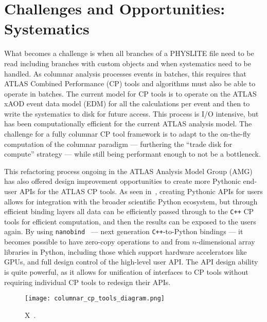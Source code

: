 \section{Challenges and Opportunities: Systematics}\label{sec:challenges}

What becomes a challenge is when all branches of a PHYSLITE file need to be read including branches with custom objects and when systematics need to be handled.
As columnar analysis processes events in batches, this requires that ATLAS Combined Performance (CP) tools and algorithms must also be able to operate in batches.
The current model for CP tools is to operate on the ATLAS xAOD event data model (EDM) for all the calculations per event and then to write the systematics to disk for future access.
This process is I/O intensive, but has been computationally efficient for the current ATLAS analysis model.
The challenge for a fully columnar CP tool framework is to adapt to the on-the-fly computation of the columnar paradigm --- furthering the ``trade disk for compute'' strategy --- while still being performant enough to not be a bottleneck.

This refactoring process ongoing in the ATLAS Analysis Model Group (AMG) has also offered design improvement opportunities to create more Pythonic end-user APIs for the ATLAS CP tools.
As seen in~, creating Pythonic APIs for users allows for integration with the broader scientific Python ecosystem, but through efficient binding layers all data can be efficiently passed through to the \texttt{C++} CP tools for efficient computation, and then the results can be exposed to the users again.
By using \texttt{nanobind}~\cite{nanobind} --- next generation \texttt{C++}-to-Python bindings --- it becomes possible to have zero-copy operations to and from $n$-dimensional array libraries in Python, including those which support hardware accelerators like GPUs, and full design control of the high-level user API.
The API design ability is quite powerful, as it allows for unification of interfaces to CP tools without requiring individual CP tools to redesign their APIs.


\begin{figure}
    \centering
    \texttt{[image: columnar\_cp\_tools\_diagram.png]}
    \caption{X~\cite{Vigl:ACAT_2024}.}
    \label{fig:columnar_cp_tools_diagram}
\end{figure}
